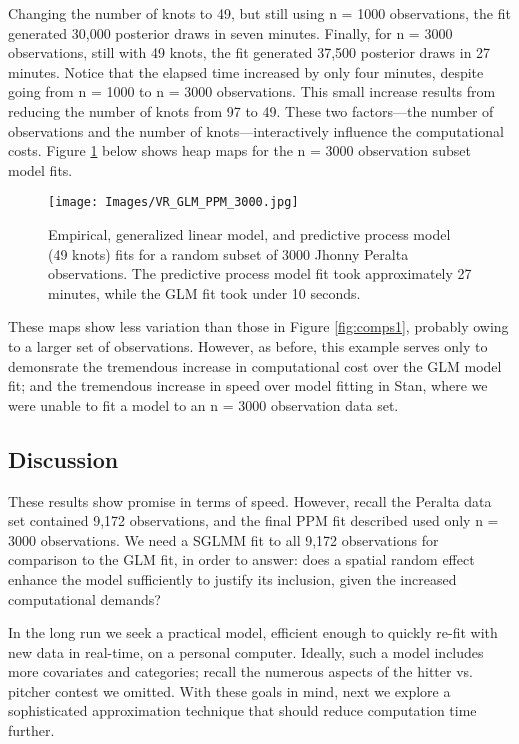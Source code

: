 Changing the number of knots to 49, but still using n = 1000 observations, the fit generated 30,000 posterior draws in seven minutes. Finally, for n = 3000 observations, still with 49 knots, the fit generated 37,500 posterior draws in 27 minutes. Notice that the elapsed time increased by only four minutes, despite going from n = 1000 to n = 3000 observations. This small increase results from reducing the number of knots from 97 to 49. These two factors---the number of observations and the number of knots---interactively influence the computational costs. Figure \ref{fig:comps2} below shows heap maps for the n = 3000 observation subset model fits. 
  \begin{figure}[H]
	\centering 
	\texttt{[image: Images/VR\_GLM\_PPM\_3000.jpg]}
	\caption{Empirical, generalized linear model, and predictive process model (49 knots) fits for a random subset of 3000 Jhonny Peralta observations. The predictive process model fit took approximately 27 minutes, while the GLM fit took under 10 seconds.}
	\label{fig:comps2}
	\end{figure}
These maps show less variation than those in Figure \ref{fig:comps1}, probably owing to a larger set of observations. However, as before, this example serves only to demonsrate the tremendous increase in computational cost over the GLM model fit; and the tremendous increase in speed over model fitting in Stan, where we were unable to fit a model to an n = 3000 observation data set. 

\subsection{Discussion}
These results show promise in terms of speed. However, recall the Peralta data set contained 9,172 observations, and the final PPM fit described used only n = 3000 observations. We need a SGLMM fit to all 9,172 observations for comparison to the GLM fit, in order to answer: does a spatial random effect enhance the model sufficiently to justify its inclusion, given the increased computational demands?  

In the long run we seek a practical model, efficient enough to quickly re-fit with new data in real-time, on a personal computer. Ideally, such a model includes more covariates and categories; recall the numerous aspects of the hitter vs. pitcher contest we omitted. With these goals in mind, next we explore a sophisticated approximation technique that should reduce computation time further.

